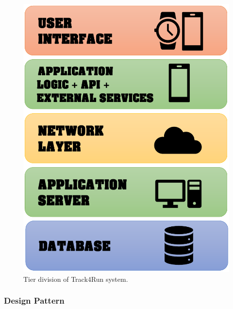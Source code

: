 \documentclass[a4paper]{article}
\begin{document}
\begin{figure}[H]
    \centering
    \includegraphics[width=\linewidth]{Track4Run-tier-division}
    \caption{Tier division of Track4Run system.}
    \label{fig:my_label}
\end{figure}
\clearpage

\subsubsection{Design Pattern}
\end{document}
